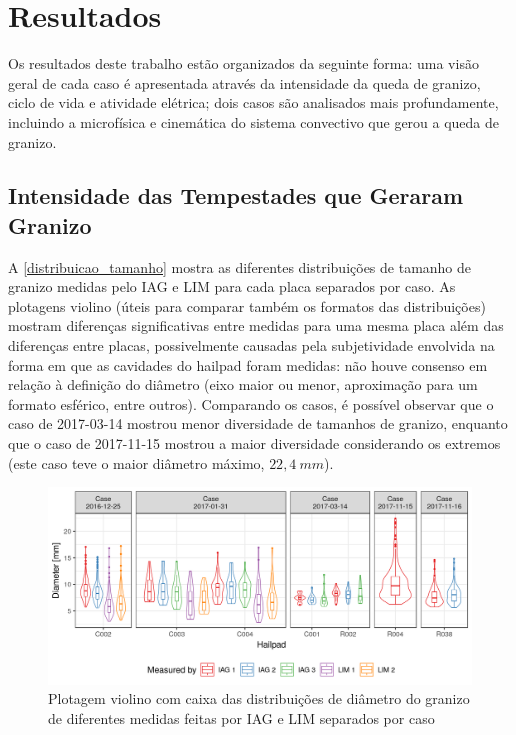 \chapter{Resultados}\label{resultados}

Os resultados deste trabalho estão organizados da seguinte forma: uma visão geral de cada caso é apresentada através da intensidade da queda de granizo, ciclo de vida e atividade elétrica; dois casos são analisados mais profundamente, incluindo a microfísica e cinemática do sistema convectivo que gerou a queda de granizo.

\section{Intensidade das Tempestades que Geraram Granizo}\label{ciclo_vida}

A \autoref{distribuicao_tamanho} mostra as diferentes distribuições de tamanho de granizo medidas pelo IAG e LIM para cada placa separados por caso. As plotagens violino (úteis para comparar também os formatos das distribuições) mostram diferenças significativas entre medidas para uma mesma placa além das diferenças entre placas, possivelmente causadas pela subjetividade envolvida na forma em que as cavidades do hailpad foram medidas: não houve consenso em relação à definição do diâmetro (eixo maior ou menor, aproximação para um formato esférico, entre outros). Comparando os casos, é possível observar que o caso de 2017-03-14 mostrou menor diversidade de tamanhos de granizo, enquanto que o caso de 2017-11-15 mostrou a maior diversidade considerando os extremos (este caso teve o maior diâmetro máximo, $22,4\:mm$).

\begin{figure}[hbt]
	\begin{center}
		\caption{Plotagem violino com caixa das distribuições de diâmetro do granizo de diferentes medidas feitas por IAG e LIM separados por caso} 
		\label{distribuicao_tamanho}
		\includegraphics[width=\columnwidth]{../Hailpads_Processing/figures/measures_distribution.png}
	\end{center}
\end{figure}

